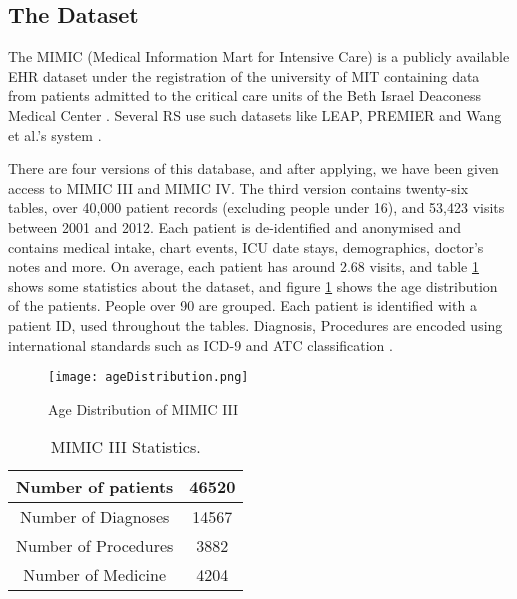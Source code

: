 \label{Testing}

\subsection{
The Dataset 
}


The MIMIC (Medical Information Mart for Intensive Care) is a publicly
available EHR dataset under the registration of the university of MIT
containing data from patients admitted to the critical care units of the Beth
Israel Deaconess Medical Center \cite{Johnson2016}.
Several RS use such datasets like LEAP, PREMIER and Wang
et al.'s system \cite{Wang}. 

There are four versions of this database, and after applying, we have been
given access to MIMIC III and MIMIC IV. The third version contains twenty-six
tables, over 40,000 patient records (excluding people under 16), and 53,423
visits between 2001 and 2012. Each patient is de-identified and anonymised and
contains medical intake, chart events, ICU date stays, demographics, doctor's
notes and more. On average, each patient has around 2.68 visits, and table \ref{age}
shows some statistics about the dataset, and figure \ref{statistics} shows the age
distribution of the patients. People over 90 are grouped. Each patient is
identified with a patient ID, used throughout the tables. Diagnosis, Procedures
are encoded using international standards such as ICD-9 and ATC classification .

\begin{figure}[h]
    \texttt{[image: ageDistribution.png]}
    \caption{Age Distribution of MIMIC III}
    \label{age}
\end{figure}


\begin{table}[h]

    \caption{MIMIC III Statistics.}
    \label{statistics}
\begin{center}
\begin{tabular}{ | c | c | }
    \hline
 Number of patients     & 46520 \\ 
    \hline
 Number of Diagnoses    & 14567 \\  
    \hline
 Number of Procedures   & 3882  \\
    \hline
 Number of Medicine     & 4204  \\
    \hline
\end{tabular}
\end{center}

    \end{table}


